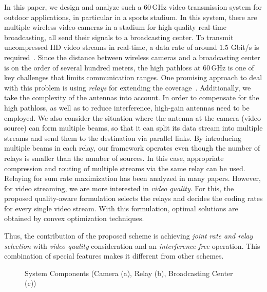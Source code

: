\documentclass[conference]{IEEEtran}
\begin{document}
In this paper, we design and analyze such a 60\,GHz video transmission system for outdoor applications, in particular in a sports stadium.
In this system, there are multiple wireless video cameras in a stadium for high-quality real-time broadcasting, all send their signals to a broadcasting center.
To transmit uncompressed HD video streams in real-time, a data rate of around $1.5$ Gbit/s is required~\cite{kim11pimrc}.
Since the distance between wireless cameras and a broadcasting center is on the order of several hundred meters, the high pathloss at 60\,GHz is one of key challenges that limits communication ranges.
One promising approach to deal with this problem is using \textit{relays} for extending the coverage~\cite{kim11pimrc}.
Additionally, we take the complexity of the antennas into account. In order to compensate for the high pathloss, as well as to reduce interference, high-gain antennas need to be employed. We also consider the situation where the antenna at the camera (video source) can form multiple beams, so that it can split its data stream into multiple streams and send them to the destination via parallel links.
By introducing multiple beams in each relay, our framework operates even though the number of relays is smaller than the number of sources.
In this case, appropriate compression and routing of multiple streams via the same relay can be used.
Relaying for sum rate maximization has been analyzed in many papers. However, for video streaming, we are more interested in {\em video quality}. For this, the proposed quality-aware formulation selects the relays and decides the coding rates for every single video stream. With this formulation, optimal solutions are obtained by convex optimization techniques.

Thus, the contribution of the proposed scheme is achieving \textit{joint rate and relay selection} with \textit{video quality} consideration and an \textit{interference-free} operation. This combination of special features makes it different from other schemes.

\begin{figure*}[t!]
	\centering
	\caption{System Components (Camera (a), Relay (b), Broadcasting Center (c))}
	\label{fig:sysmodule}
\end{figure*}
\end{document}
